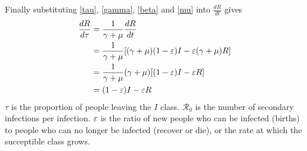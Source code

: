 Finally substituting \ref{tau}, \ref{gamma}, \ref{beta} and \ref{mu} into $\frac{dR}{dt}$ gives
\begin{align*}
    \frac{dR}{d\tau} &= \frac{1}{\gamma+\mu}\frac{dR}{dt}\nonumber\\
     &= \frac{1}{\gamma+\mu}[(\gamma+\mu)(1-\varepsilon)I - \varepsilon(\gamma+\mu)R]\nonumber\\
     &= \frac{1}{\gamma+\mu}(\gamma+\mu)[(1-\varepsilon)I - \varepsilon R]\nonumber\\
     &= (1-\varepsilon)I - \varepsilon R
\end{align*}
$\tau$ is the proportion of people leaving the $I$ class.
${\mathcal R_0}$ is the number of secondary infections per infection.
$\varepsilon$ is the ratio of new people who can be infected (births) to people who can no longer be infected (recover or die), or the rate at which the succeptible class grows.
